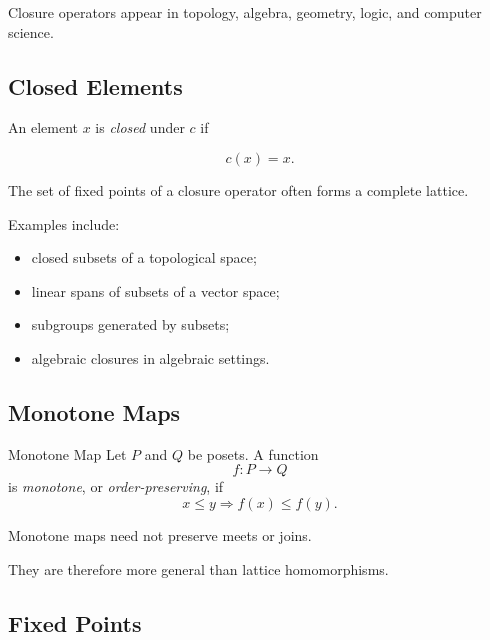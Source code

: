 Closure operators appear in topology, algebra, geometry, logic, and computer
science.

\subsection{Closed Elements}
\label{subsec:lattice-closed-elements}

An element \(x\) is \emph{closed} under \(c\) if

\[ c(x)=x. \]

The set of fixed points of a closure operator often forms a complete
lattice.

Examples include:

\begin{itemize}
    \item closed subsets of a topological space;
    \item linear spans of subsets of a vector space;
    \item subgroups generated by subsets;
    \item algebraic closures in algebraic settings.
\end{itemize}

\subsection{Monotone Maps}
\label{subsec:lattice-monotone-maps}

\begin{definitionbox}{Monotone Map}
Let \(P\) and \(Q\) be posets. A function
\[ f:P\to Q \]
is \emph{monotone}, or \emph{order-preserving}, if
\[ x\leq y\Longrightarrow f(x)\leq f(y). \]
\end{definitionbox}

Monotone maps need not preserve meets or joins.

They are therefore more general than lattice homomorphisms.

\subsection{Fixed Points}
\label{subsec:lattice-fixed-points}

